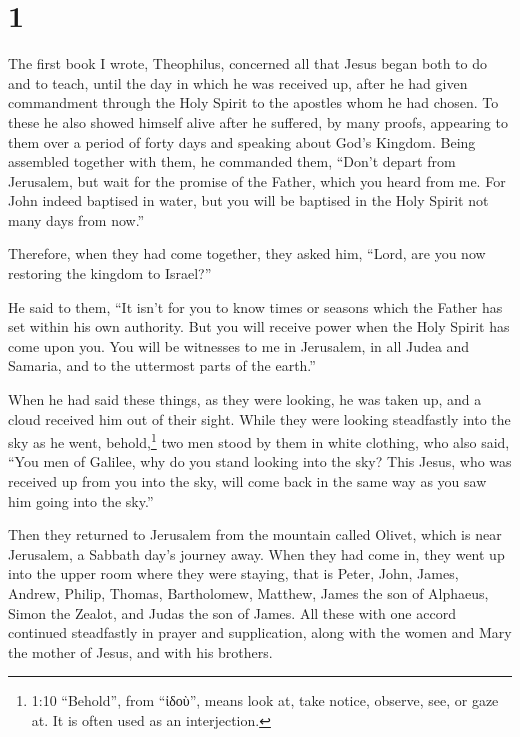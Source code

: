 \hypertarget{section}{%
\section{1}\label{section}}

 The first book I wrote, Theophilus, concerned all that
Jesus began both to do and to teach,  until the day in which
he was received up, after he had given commandment through the Holy
Spirit to the apostles whom he had chosen.  To these he also
showed himself alive after he suffered, by many proofs, appearing to
them over a period of forty days and speaking about God's Kingdom.
 Being assembled together with them, he commanded them,
``Don't depart from Jerusalem, but wait for the promise of the Father,
which you heard from me.  For John indeed baptised in water,
but you will be baptised in the Holy Spirit not many days from now.''

 Therefore, when they had come together, they asked him,
``Lord, are you now restoring the kingdom to Israel?''

 He said to them, ``It isn't for you to know times or
seasons which the Father has set within his own authority. 
But you will receive power when the Holy Spirit has come upon you. You
will be witnesses to me in Jerusalem, in all Judea and Samaria, and to
the uttermost parts of the earth.''

 When he had said these things, as they were looking, he was
taken up, and a cloud received him out of their sight. 
While they were looking steadfastly into the sky as he went,
behold,\footnote{1:10 ``Behold'', from ``ἰδοὺ'', means look at, take
  notice, observe, see, or gaze at. It is often used as an interjection.}
two men stood by them in white clothing,  who also said,
``You men of Galilee, why do you stand looking into the sky? This Jesus,
who was received up from you into the sky, will come back in the same
way as you saw him going into the sky.''

 Then they returned to Jerusalem from the mountain called
Olivet, which is near Jerusalem, a Sabbath day's journey away.
 When they had come in, they went up into the upper room
where they were staying, that is Peter, John, James, Andrew, Philip,
Thomas, Bartholomew, Matthew, James the son of Alphaeus, Simon the
Zealot, and Judas the son of James.  All these with one
accord continued steadfastly in prayer and supplication, along with the
women and Mary the mother of Jesus, and with his brothers.

